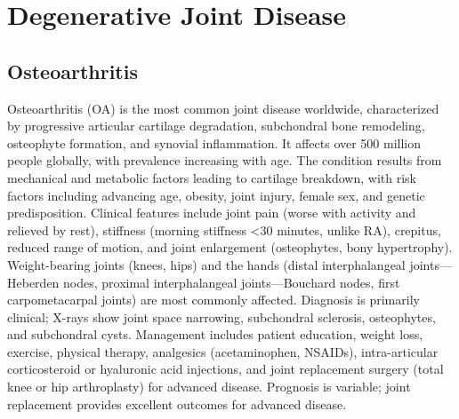 \section{Degenerative Joint Disease}








\label{sec:Degenerative Joint Disease}

\subsection{Osteoarthritis}
\label{sec:Osteoarthritis}
Osteoarthritis (OA) is the most common joint disease worldwide, characterized by progressive articular cartilage degradation, subchondral bone remodeling, osteophyte formation, and synovial inflammation. It affects over 500 million people globally, with prevalence increasing with age. The condition results from mechanical and metabolic factors leading to cartilage breakdown, with risk factors including advancing age, obesity, joint injury, female sex, and genetic predisposition. Clinical features include joint pain (worse with activity and relieved by rest), stiffness (morning stiffness <30 minutes, unlike RA), crepitus, reduced range of motion, and joint enlargement (osteophytes, bony hypertrophy). Weight-bearing joints (knees, hips) and the hands (distal interphalangeal joints---Heberden nodes, proximal interphalangeal joints---Bouchard nodes, first carpometacarpal joints) are most commonly affected. Diagnosis is primarily clinical; X-rays show joint space narrowing, subchondral sclerosis, osteophytes, and subchondral cysts. Management includes patient education, weight loss, exercise, physical therapy, analgesics (acetaminophen, NSAIDs), intra-articular corticosteroid or hyaluronic acid injections, and joint replacement surgery (total knee or hip arthroplasty) for advanced disease. Prognosis is variable; joint replacement provides excellent outcomes for advanced disease.

